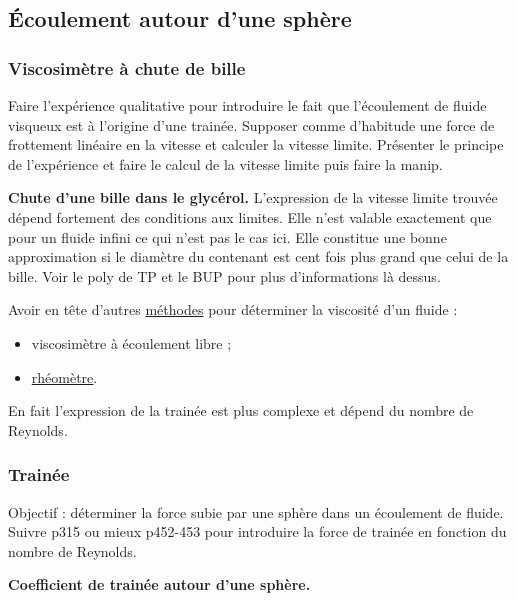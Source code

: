 \subsection{Écoulement autour d'une sphère}

\subsubsection{Viscosimètre à chute de bille}

Faire l'expérience qualitative pour introduire le fait que l'écoulement de fluide visqueux est à l'origine d'une trainée.
Supposer \og comme d'habitude \fg{} une force de frottement linéaire en la vitesse et calculer la vitesse limite.
Présenter le principe de l'expérience et faire le calcul de la vitesse limite puis faire la manip.

\begin{experience}
\textbf{Chute d'une bille dans le glycérol.}
L'expression de la vitesse limite trouvée dépend fortement des conditions aux limites.
Elle n'est valable exactement que pour un fluide infini ce qui n'est pas le cas ici.
Elle constitue une bonne approximation si le diamètre du contenant est cent fois plus grand que celui de la bille.
Voir le poly de TP et le BUP pour plus d'informations là dessus.
\end{experience}

\begin{remarque}
Avoir en tête d'autres \href{https://fr.wikipedia.org/wiki/Viscosim\%C3\%A8tre}{méthodes} pour déterminer la viscosité d'un fluide :
\begin{itemize}
\item viscosimètre à écoulement libre ;
\item \href{https://fr.wikipedia.org/wiki/Rh\%C3\%A9om\%C3\%A8tre}{rhéomètre}.
\end{itemize}
\end{remarque}

\begin{transition}
En fait l'expression de la trainée est plus complexe et dépend du nombre de Reynolds.
\end{transition}

\subsubsection{Trainée}

Objectif : déterminer la force subie par une sphère dans un écoulement de fluide.
Suivre \cite{Sanz2016} p315 ou mieux \cite{Guyon2001} p452-453 pour introduire la force de trainée en fonction du nombre de Reynolds.
\begin{slide}
\textbf{Coefficient de trainée autour d'une sphère.}
\end{slide}

